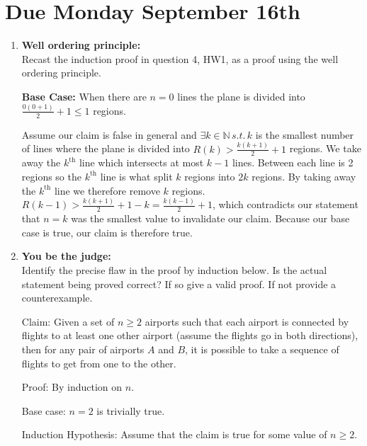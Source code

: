 \documentclass[11pt,fleqn]{article}
\begin{document}
\maketitle

\section*{Due Monday September 16th}

\begin{enumerate}

\item {\bf Well ordering principle:}\\
Recast the induction proof in question 4, HW1, as a proof using the well ordering principle. 

{\bf Base Case:} When there are $n=0$ lines the plane is divided into $\frac {0(0+1)}2 + 1 \leq 1$ regions.

Assume our claim is false in general and $\exists k \in \mathbb{N}\, s.t.\, k$ is the smallest number of lines where the plane is divided into $R(k) > \frac {k(k+1)}2 + 1$ regions. We take away the $k^\text{th}$ line which intersects at most $k-1$ lines. Between each line is 2 regions so the $k^\text{th}$ line is what split $k$ regions into $2k$ regions. By taking away the $k^\text{th}$ line we therefore remove $k$ regions. \\
$R(k-1) > \frac {k(k+1)}2 + 1 - k = \frac {k(k-1)}2 + 1$, which contradicts our statement that $n=k$ was the smallest value to invalidate our claim. Because our base case is true, our claim is therefore true.

\newpage
\item {\bf You be the judge:}\\
Identify the precise flaw in the proof by induction below. Is the actual statement being proved correct? If so give a valid proof. If not provide a counterexample. 

Claim: Given a set of $n \geq 2$ airports such that each airport is connected by flights to at least one other airport (assume the flights go in both directions), 
then for any pair of airports $A$ and $B$, it is possible to take a sequence of flights to get from one to the other. 

Proof: By induction on $n$. 

Base case: $n = 2$ is trivially true. 

Induction Hypothesis: Assume that the claim is true for some value of $n \geq 2$. 


\end{enumerate}
\end{document}
